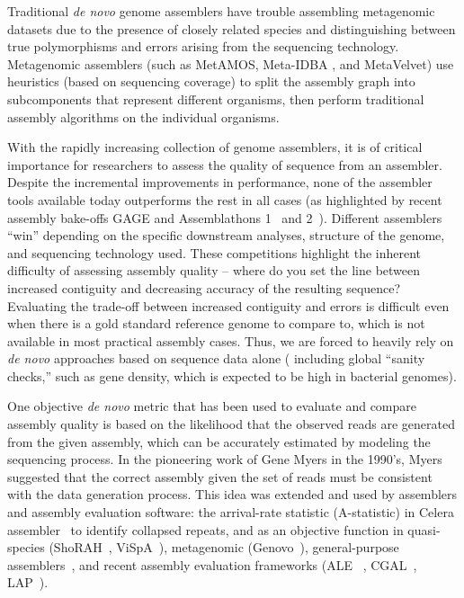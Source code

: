\documentclass[conference]{IEEEtran}
\begin{document}
Traditional \emph{de novo} genome assemblers have trouble assembling metagenomic datasets due to the presence of closely related species and distinguishing between true polymorphisms and errors arising from the sequencing technology.
Metagenomic assemblers (such as MetAMOS\cite{treangen2013metamos}, Meta-IDBA \cite{peng2011meta}, and MetaVelvet\cite{namiki2012metavelvet}) use heuristics (based on sequencing coverage) to split the assembly graph into subcomponents that represent different organisms, then perform traditional assembly algorithms on the individual organisms.

With the rapidly increasing collection of genome assemblers, it is of critical importance for researchers to assess the quality of sequence from an assembler.
Despite the incremental improvements in performance, none of the assembler tools available today outperforms the rest in all cases (as highlighted by recent assembly
bake-offs GAGE\cite{salzberg2011gage} and Assemblathons 1~\cite{earl2011assemblathon} and 2~\cite{bradnam2013assemblathon}).
Different assemblers ``win'' depending on the specific downstream analyses, structure of the genome, and sequencing technology used.
These competitions highlight the inherent difficulty of assessing assembly quality -- where do you set the line between increased contiguity and decreasing accuracy of the resulting sequence?
Evaluating the trade-off between increased contiguity and errors is difficult even when there is a gold standard reference genome to compare to, which is not available in most practical assembly cases.
Thus, we are forced to heavily rely on \emph{de novo} approaches based on sequence data alone ( including global ``sanity checks,'' such as gene density, which is expected to be high in bacterial genomes).

One objective \emph{de novo} metric that has been used to evaluate and compare assembly quality is based on the likelihood that the observed reads are generated from the given assembly, which can be accurately estimated by modeling the sequencing process.
In the pioneering work of Gene Myers in the 1990's, Myers suggested that the correct assembly given the set of reads must be consistent with the data generation process.
This idea was extended and used by assemblers and assembly evaluation software: the arrival-rate statistic (A-statistic) in Celera
assembler~\cite{CeleraAssembler} to identify collapsed repeats, and
as an objective function in quasi-species (ShoRAH~\cite{SHORAH},
ViSpA~\cite{VISPA}), metagenomic (Genovo~\cite{genovo2011}),
general-purpose assemblers~\cite{medvedev2009maximum}, and recent assembly
evaluation frameworks (ALE ~\cite{clark2013ale}, CGAL~\cite{rahman2013cgal}, LAP~\cite{LAP}).
\end{document}
